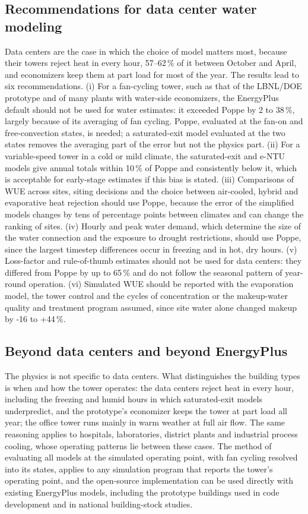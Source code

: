 \documentclass[preprint,12pt]{elsarticle}
\begin{document}
\subsection{Recommendations for data center water modeling}\label{sec:dcrec}
Data centers are the case in which the choice of model matters most, because their towers reject heat in every hour,
57--62\,\% of it between October and April, and economizers keep them at part load for most of the year. The results
lead to six recommendations. (i) For a fan-cycling tower, such as that of the LBNL/DOE prototype and of many plants
with water-side economizers, the EnergyPlus default should not be used for water estimates: it exceeded Poppe by 2 to
38\,\%, largely because of its averaging of fan cycling. Poppe, evaluated at the fan-on and free-convection states, is
needed; a saturated-exit model evaluated at the two states removes the averaging part of the error but not the physics
part. (ii) For a variable-speed tower in a cold or mild climate, the saturated-exit and e-NTU models give annual totals
within 10\,\% of Poppe and consistently below it, which is acceptable for early-stage estimates if this bias is stated.
(iii) Comparisons of WUE across sites, siting decisions and the choice between air-cooled, hybrid and evaporative heat
rejection should use Poppe, because the error of the simplified models changes by tens of percentage points between
climates and can change the ranking of sites. (iv) Hourly and peak water demand, which determine the size of the water
connection and the exposure to drought restrictions, should use Poppe, since the largest timestep differences occur in
freezing and in hot, dry hours. (v) Loss-factor and rule-of-thumb estimates should not be used for data centers: they
differed from Poppe by up to 65\,\% and do not follow the seasonal pattern of year-round operation. (vi) Simulated WUE
should be reported with the evaporation model, the tower control and the cycles of concentration or the makeup-water
quality and treatment program assumed, since site water alone changed makeup by -16 to +44\,\%.

\subsection{Beyond data centers and beyond EnergyPlus}
The physics is not specific to data centers. What distinguishes the building types is when and how the tower operates:
the data centers reject heat in every hour, including the freezing and humid hours in which saturated-exit models
underpredict, and the prototype's economizer keeps the tower at part load all year; the office tower runs mainly in warm
weather at full air flow. The same reasoning applies to hospitals, laboratories, district plants and industrial process
cooling, whose operating patterns lie between these cases. The method of evaluating all models at the simulated operating
point, with fan cycling resolved into its states, applies to any simulation program that reports the tower's operating
point, and the open-source implementation can be used directly with existing EnergyPlus models, including the prototype
buildings used in code development and in national building-stock studies.
\end{document}
